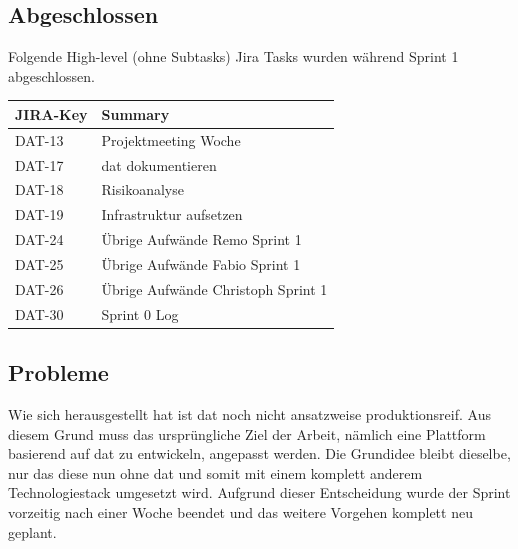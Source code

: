 \subsection{Abgeschlossen}
Folgende High-level (ohne Subtasks) Jira Tasks wurden während Sprint 1 abgeschlossen.

\begin{table}[H]
\centering
\begin{tabular}{ll}
	\toprule
	\textbf{JIRA-Key} & \textbf{Summary}\\
	\midrule
	DAT-13 & Projektmeeting Woche \\
	DAT-17 & dat dokumentieren \\
	DAT-18 & Risikoanalyse \\
	DAT-19 & Infrastruktur aufsetzen \\
	DAT-24 & Übrige Aufwände Remo Sprint 1 \\
	DAT-25 & Übrige Aufwände Fabio Sprint 1 \\
	DAT-26 & Übrige Aufwände Christoph Sprint 1 \\
	DAT-30 & Sprint 0 Log\\
	\bottomrule
\end{tabular}	
\end{table}

\subsection{Probleme}\label{sec:pm:sprint1-probleme}
Wie sich herausgestellt hat ist \gls{dat} noch nicht ansatzweise produktionsreif. Aus diesem Grund muss das ursprüngliche Ziel der Arbeit, nämlich eine Plattform basierend auf \gls{dat} zu entwickeln, angepasst werden. Die Grundidee bleibt dieselbe, nur das diese nun ohne \gls{dat} und somit mit einem komplett anderem Technologiestack umgesetzt wird. Aufgrund dieser Entscheidung wurde der Sprint vorzeitig nach einer Woche beendet und das weitere Vorgehen komplett neu geplant.